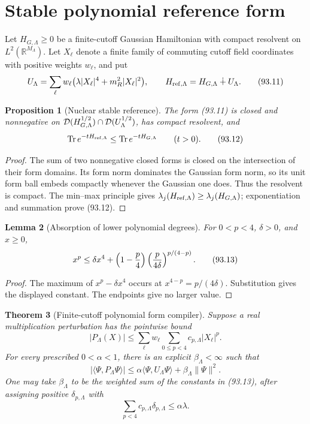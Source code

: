 \documentclass[11pt]{article}
\newtheorem{theorem}{Theorem}[section]
\newtheorem{proposition}[theorem]{Proposition}
\newtheorem{lemma}[theorem]{Lemma}
\theoremstyle{remark}
\begin{document}
\section{Stable polynomial reference form}

Let \(H_{G,\Lambda}\geq0\) be a finite-cutoff Gaussian Hamiltonian
with compact resolvent on \(L^2(\mathbb R^{M_\Lambda})\).  Let
\(X_\ell\) denote a finite family of commuting cutoff field
coordinates with positive weights \(w_\ell\), and put
\[
 U_\Lambda
 =\sum_\ell w_\ell
   \bigl(\lambda|X_\ell|^4+m_R^2|X_\ell|^2\bigr),
 \qquad
 H_{{\rm ref},\Lambda}
 =H_{G,\Lambda}\dotplus U_\Lambda.                    \tag{93.11}
\]

\begin{proposition}[Nuclear stable reference]
\label{prop:v15v93-reference}
The form (93.11) is closed and nonnegative on
\({\cal D}(H_{G,\Lambda}^{1/2})\cap{\cal D}(U_\Lambda^{1/2})\),
has compact resolvent, and
\[
 \operatorname{Tr}e^{-tH_{{\rm ref},\Lambda}}
 \leq\operatorname{Tr}e^{-tH_{G,\Lambda}}
 \qquad(t>0).                                         \tag{93.12}
\]
\end{proposition}

\begin{proof}
The sum of two nonnegative closed forms is closed on the
intersection of their form domains.  Its form norm dominates the
Gaussian form norm, so its unit form ball embeds compactly whenever
the Gaussian one does.  Thus the resolvent is compact.  The min--max
principle gives
\(\lambda_j(H_{{\rm ref},\Lambda})
\geq\lambda_j(H_{G,\Lambda})\); exponentiation and summation prove
(93.12).
\end{proof}

\begin{lemma}[Absorption of lower polynomial degrees]
\label{lem:v15v93-young}
For \(0<p<4\), \(\delta>0\), and \(x\geq0\),
\[
 x^p\leq\delta x^4+
 \left(1-{p\over4}\right)
 \left({p\over4\delta}\right)^{p/(4-p)}.              \tag{93.13}
\]
\end{lemma}

\begin{proof}
The maximum of \(x^p-\delta x^4\) occurs at
\(x^{4-p}=p/(4\delta)\).  Substitution gives the displayed
constant.  The endpoints give no larger value.
\end{proof}

\begin{theorem}[Finite-cutoff polynomial form compiler]
\label{thm:v15v93-polynomial}
Suppose a real multiplication perturbation has the pointwise bound
\[
 |P_\Lambda(X)|
 \leq\sum_\ell w_\ell\sum_{0\leq p<4}
       c_{p,\Lambda}|X_\ell|^p.                       \tag{93.14}
\]
For every prescribed \(0<\alpha<1\), there is an explicit
\(\beta_\Lambda<\infty\) such that
\[
 |\langle\Psi,P_\Lambda\Psi\rangle|
 \leq\alpha\langle\Psi,U_\Lambda\Psi\rangle
      +\beta_\Lambda\|\Psi\|^2.                       \tag{93.15}
\]
One may take \(\beta_\Lambda\) to be the weighted sum of the
constants in (93.13), after assigning positive
\(\delta_{p,\Lambda}\) with
\[
 \sum_{p<4}c_{p,\Lambda}\delta_{p,\Lambda}
 \leq\alpha\lambda.                                   \tag{93.16}
\]
\end{theorem}
\end{document}
